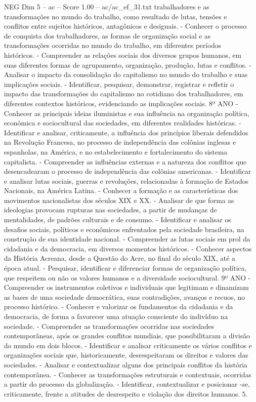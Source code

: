 \begin{textsample}{NEG Dim 5 – ac – Score 1.00 – ac/ac\_ef\_31.txt}
trabalhadores e as transformações no mundo do trabalho, como resultado de lutas, tensões e conflitos entre sujeitos históricos, antagônicos e desiguais. - Conhecer o processo de conquista dos trabalhadores, as formas de organização social e as transformações ocorridas no mundo do trabalho, em diferentes períodos históricos. - Compreender as relações sociais dos diversos grupos humanos, em suas diferentes formas de agrupamento, organização, produção, lutas e conflitos. - Analisar o impacto da consolidação do capitalismo no mundo do trabalho e suas implicações sociais. - Identificar, pesquisar, demonstrar, registrar e refletir o impacto das transformações do capitalismo no cotidiano dos trabalhadores, em diferentes contextos históricos, evidenciando as implicações sociais. 8º ANO - Conhecer as principais ideias iluministas e sua influência na organização política, econômica e sociocultural das sociedades, em diferentes realidades históricas. - Identificar e analisar, criticamente, a influência dos princípios liberais defendidos na Revolução Francesa, no processo de independência das colônias inglesas e espanholas, na América, e no estabelecimento e fortalecimento do sistema capitalista. - Compreender as influências externas e a natureza dos conflitos que desencadearam o processo de independência das colônias americanas. - Identificar e analisar lutas sociais, guerras e revoluções, relacionadas à formação de Estados Nacionais, na América Latina. - Conhecer a formação e as características dos movimentos nacionalistas dos séculos XIX e XX. - Analisar de que forma as ideologias provocam rupturas nas sociedades, a partir de mudanças de mentalidades, de padrões culturais e de consumo. - Identificar e analisar os desafios sociais, políticos e econômicos enfrentados pela sociedade brasileira, na construção de sua identidade nacional. - Compreender as lutas sociais em prol da cidadania e da democracia, em diversos momentos históricos. - Conhecer aspectos da História Acreana, desde a Questão do Acre, no final do século XIX, até a época atual. - Pesquisar, identificar e diferenciar formas de organização política, que respeitem ou não os valores humanos e a diversidade sociocultural. 9º ANO - Compreender os instrumentos coletivos e individuais que legitimam e dinamizam as bases de uma sociedade democrática, suas contradições, avanços e recuos, no processo histórico. - Conhecer e valorizar os fundamentos da cidadania e da democracia, de forma a favorecer uma atuação consciente do indivíduo na sociedade. - Compreender as transformações ocorridas nas sociedades contemporâneas, após os grandes conflitos mundiais, que possibilitaram a divisão do mundo em dois blocos. - Identificar e analisar criticamente os vários conflitos e organizações sociais que, historicamente, desrespeitaram os direitos e valores das sociedades. - Analisar e contextualizar alguns dos principais conflitos da história contemporânea. - Conhecer as transformações estruturais e contextuais, ocorridas a partir do processo da globalização. - Identificar, contextualizar e posicionar -se, criticamente, frente a atitudes de desrespeito e violação dos direitos humanos. 5.

\end{textsample}

